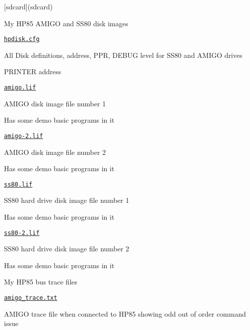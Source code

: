 \mbox{[}sdcard\mbox{]}(sdcard)
\begin{DoxyItemize}
\item My H\+P85 A\+M\+I\+GO and S\+S80 disk images
\begin{DoxyItemize}
\item \href{sdcard/hpdisk.cfg}{\tt hpdisk.\+cfg}
\begin{DoxyItemize}
\item All Disk definitions, address, P\+PR, D\+E\+B\+UG level for S\+S80 and A\+M\+I\+GO drives
\item P\+R\+I\+N\+T\+ER address
\end{DoxyItemize}
\item \href{sdcard/amigo.lif}{\tt amigo.\+lif}
\begin{DoxyItemize}
\item A\+M\+I\+GO disk image file number 1
\item Has some demo basic programs in it
\end{DoxyItemize}
\item \href{sdcard/amigo-2.lif}{\tt amigo-\/2.\+lif}
\begin{DoxyItemize}
\item A\+M\+I\+GO disk image file number 2
\item Has some demo basic programs in it
\end{DoxyItemize}
\item \href{sdcard/ss80.lif}{\tt ss80.\+lif}
\begin{DoxyItemize}
\item S\+S80 hard drive disk image file number 1
\item Has some demo basic programs in it
\end{DoxyItemize}
\item \href{sdcard/ss80-2.lif}{\tt ss80-\/2.\+lif}
\begin{DoxyItemize}
\item S\+S80 hard drive disk image file number 2
\item Has some demo basic programs in it
\end{DoxyItemize}
\end{DoxyItemize}
\item My H\+P85 bus trace files
\begin{DoxyItemize}
\item \href{sdcard/amigo_trace.txt}{\tt amigo\+\_\+trace.\+txt}
\begin{DoxyItemize}
\item A\+M\+I\+GO trace file when connected to H\+P85 showing odd out of order command issue

\end{DoxyItemize}
\end{DoxyItemize}
\end{DoxyItemize}
